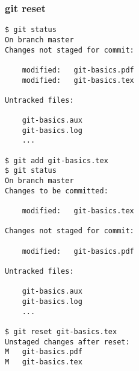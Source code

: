 \documentclass{beamer}
\begin{document}
\begin{frame}[fragile]
\frametitle{git reset}
	\tiny
	\begin{verbatim}
$ git status
On branch master
Changes not staged for commit:

	modified:   git-basics.pdf
	modified:   git-basics.tex

Untracked files:

	git-basics.aux
	git-basics.log
	...

$ git add git-basics.tex
$ git status
On branch master
Changes to be committed:

	modified:   git-basics.tex

Changes not staged for commit:

	modified:   git-basics.pdf

Untracked files:

	git-basics.aux
	git-basics.log
	...

$ git reset git-basics.tex
Unstaged changes after reset:
M	git-basics.pdf
M	git-basics.tex
	\end{verbatim}
\end{frame}
\end{document}
